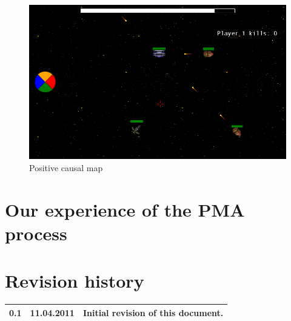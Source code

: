 \documentclass[titlepage,a4paper,11pt]{article}
\begin{document}
\begin{figure}
    \begin{center}
    \includegraphics[width=\linewidth]{graphics/ingame}
    \caption{Positive causal map}
    \label{fig:poskjmap}
    \end{center}
\end{figure}



\section{Our experience of the PMA process}


\printbibliography


\section{Revision history}

\begin{table}[H]
  \begin{tabular}{| c | c | c |}
    \hline
    0.1 & 11.04.2011 & Initial revision of this document. \\
    \hline
  \end{tabular}
\end{table}
\end{document}
